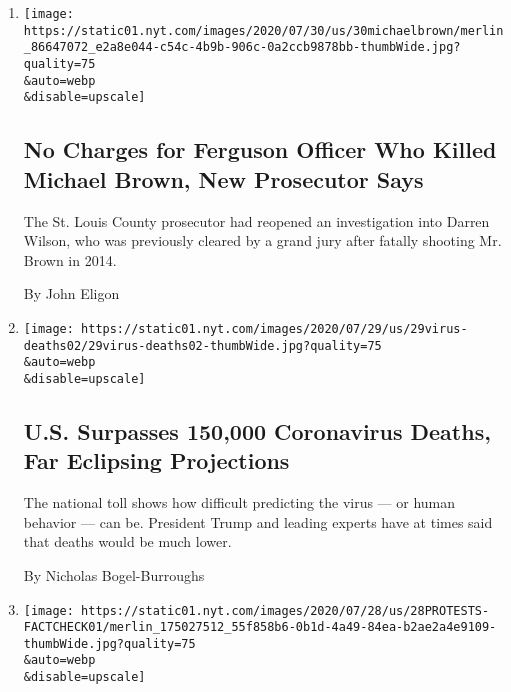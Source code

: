 \begin{enumerate}
\def\labelenumi{\arabic{enumi}.}
\item
  \href{/2020/07/30/us/michael-brown-darren-wilson-ferguson.html}{}

  \texttt{[image: https://static01.nyt.com/images/2020/07/30/us/30michaelbrown/merlin\_86647072\_e2a8e044-c54c-4b9b-906c-0a2ccb9878bb-thumbWide.jpg?quality=75\\\&auto=webp\\\&disable=upscale]}

  \hypertarget{no-charges-for-ferguson-officer-who-killed-michael-brown-new-prosecutor-says}{%
  \subsection{No Charges for Ferguson Officer Who Killed Michael Brown,
  New Prosecutor
  Says}\label{no-charges-for-ferguson-officer-who-killed-michael-brown-new-prosecutor-says}}

  The St. Louis County prosecutor had reopened an investigation into
  Darren Wilson, who was previously cleared by a grand jury after
  fatally shooting Mr. Brown in 2014.

  By John Eligon
\item
  \href{/2020/07/29/us/coronavirus-deaths-150000.html}{}

  \texttt{[image: https://static01.nyt.com/images/2020/07/29/us/29virus-deaths02/29virus-deaths02-thumbWide.jpg?quality=75\\\&auto=webp\\\&disable=upscale]}

  \hypertarget{us-surpasses-150000-coronavirus-deaths-far-eclipsing-projections}{%
  \subsection{U.S. Surpasses 150,000 Coronavirus Deaths, Far Eclipsing
  Projections}\label{us-surpasses-150000-coronavirus-deaths-far-eclipsing-projections}}

  The national toll shows how difficult predicting the virus --- or
  human behavior --- can be. President Trump and leading experts have at
  times said that deaths would be much lower.

  By Nicholas Bogel-Burroughs
\item
  \href{/2020/07/28/us/portland-protests-fact-check.html}{}

  \texttt{[image: https://static01.nyt.com/images/2020/07/28/us/28PROTESTS-FACTCHECK01/merlin\_175027512\_55f858b6-0b1d-4a49-84ea-b2ae2a4e9109-thumbWide.jpg?quality=75\\\&auto=webp\\\&disable=upscale]}


\end{enumerate}
